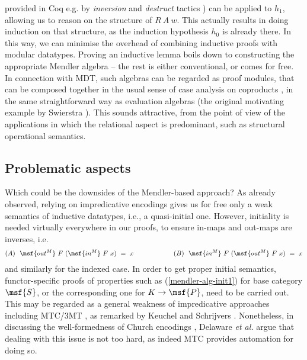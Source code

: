 \documentclass[submission,copyright,creativecommons]{eptcs}
\newcounter{prop}
\begin{document}
provided in Coq e.g. by \emph{inversion} and \emph{destruct} tactics
\cite{coqart}) can be applied to $h_1$, allowing us to reason on the
structure of $R \ A \ w$. This actually results in doing induction on
that structure, as the induction hypothesis $h_0$ is already there. In
this way, we can minimise the overhead of combining inductive proofs
with modular datatypes. Proving an inductive lemma boils down to
constructing the appropriate Mendler algebra -- the rest is either
conventional, or comes for free. In connection with MDT, such algebras
can be regarded as proof modules, that can be composed together in the
usual sense of case analysis on coproducts \cite{Swier08,Dela13}, in
the same straightforward way as evaluation algebras (the original
motivating example by Swierstra \cite{Swier08}). This sounds
attractive, from the point of view of the applications in which the
relational aspect is predominant, such as structural operational
semantics.

\subsection{Problematic aspects}

Which could be the downsides of the Mendler-based approach?
As already observed, relying on impredicative encodings gives us for
free only a weak semantics of inductive datatypes, i.e., a
quasi-initial one. However, initiality is needed virtually everywhere
in our proofs, to ensure in-maps and out-maps are inverses, i.e.
\begin{gather}  (A) \ \ \msf{out^M} \ F \ (\msf{in^M} \ F \ x)  \ = \ x  
\qquad \qquad \qquad
(B) \ \ \msf{in^M} \ F \ (\msf{out^M} \ F \ x) \ = \ x \end{gather}
and similarly for the indexed case. In order to get proper initial
semantics, functor-specific proofs of properties such as
(\ref{mendler-alg-init1}) for base category $\msf{S}$, or the
corresponding one for $K \to \msf{P}$, need to be carried out. This
may be regarded as a general weakness of impredicative approaches
including MTC/3MT \cite{Dela13,Delaware13M}, as remarked by Keuchel and
Schrijvers \cite{Keuchel13}. Nonetheless, in discussing the
well-formedness of Church encodings \cite{Dela13}, Delaware \emph{et
  al.} argue that dealing with this issue is not too hard, as indeed
MTC provides automation for doing so.
\end{document}

